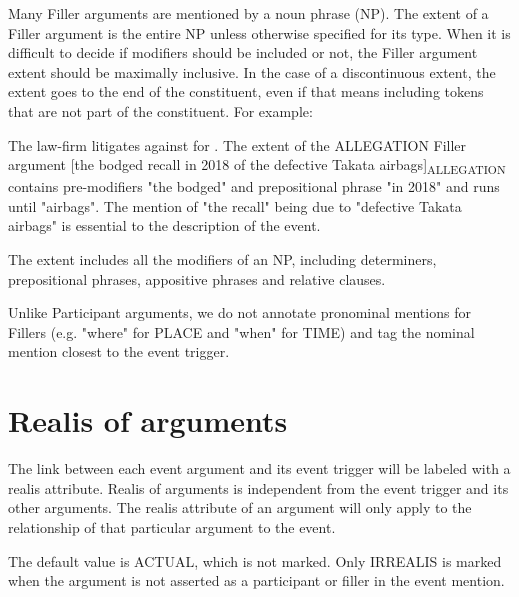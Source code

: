 Many Filler arguments are mentioned by a noun phrase (NP).
The extent of a Filler argument is the entire NP unless otherwise specified for its type.
When it is difficult to decide if modifiers should be included or not, the Filler argument extent should be maximally inclusive.
In the case of a discontinuous extent, the extent goes to the end of the constituent, even if that means including tokens that are not part of the constituent.
For example:
\begin{exe}
    \ex The law-firm litigates  against  for  .
    \expl The extent of the ALLEGATION Filler argument [the bodged recall in 2018 of the defective Takata airbags]\textsubscript{ALLEGATION} contains pre-modifiers "the bodged" and prepositional phrase "in 2018" and runs until "airbags". The mention of "the recall" being due to "defective Takata airbags" is essential to the description of the event.
\end{exe}

The extent includes all the modifiers of an NP, including determiners, prepositional phrases, appositive phrases and relative clauses.

Unlike Participant arguments, we do not annotate pronominal mentions for Fillers (e.g. "where" for PLACE and "when" for TIME) and tag the nominal mention closest to the event trigger.


\section{Realis of arguments}
The link between each event argument and its event trigger will be labeled with a realis attribute.
Realis of arguments is independent from the event trigger and its other arguments.
The realis attribute of an argument will only apply to the relationship of that particular argument to the event.

The default value is ACTUAL, which is not marked. Only IRREALIS is marked when the argument is not asserted as a participant or filler in the event mention.

